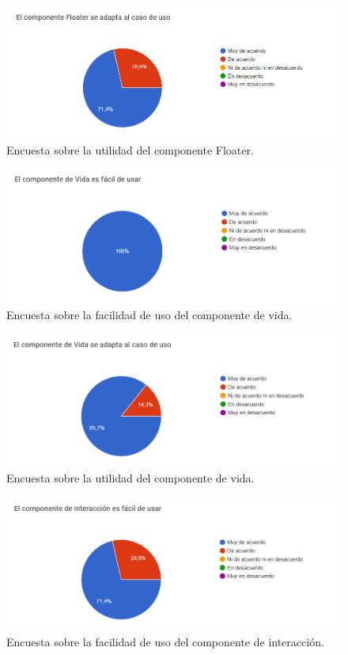 \begin{figure}[H]
  \centering
  \includegraphics[width=450px,clip=true]{CUESTIONARIO_17.png}
  \caption{Encuesta sobre la utilidad del componente Floater.}
  \label{fig:CUESTIONARIO_17}
\end{figure}
\raggedbottom

\begin{figure}[H]
  \centering
  \includegraphics[width=450px,clip=true]{CUESTIONARIO_18.png}
  \caption{Encuesta sobre la facilidad de uso del componente de vida. }
  \label{fig:CUESTIONARIO_18}
\end{figure}
\raggedbottom

\begin{figure}[H]
  \centering
  \includegraphics[width=450px,clip=true]{CUESTIONARIO_19.png}
  \caption{Encuesta sobre la utilidad del componente de vida. }
  \label{fig:CUESTIONARIO_19}
\end{figure}
\raggedbottom

\begin{figure}[H]
  \centering
  \includegraphics[width=450px,clip=true]{CUESTIONARIO_20.png}
  \caption{Encuesta sobre la facilidad de uso del componente de interacción.}
  \label{fig:CUESTIONARIO_20}
\end{figure}
\raggedbottom


